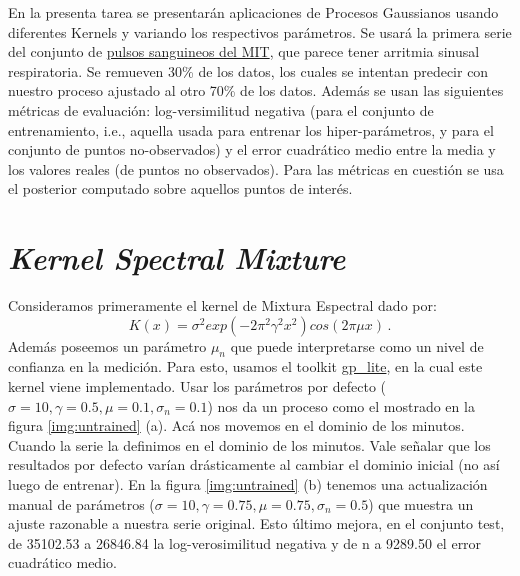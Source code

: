 \documentclass[letterpaper,11pt,oneside]{article}
\theoremstyle{break}
\begin{document}
	





\inserttitle

En la presenta tarea se presentarán aplicaciones de Procesos Gaussianos usando diferentes Kernels y variando los respectivos parámetros. Se usará la primera serie del conjunto de \href{https://ecg.mit.edu/time-series/}{pulsos sanguineos del MIT}, que parece tener arritmia sinusal respiratoria. Se remueven 30\% de los datos, los cuales se intentan predecir con nuestro proceso ajustado al otro 70\% de los datos. Además se usan las siguientes métricas de evaluación: log-versimilitud negativa (para el conjunto de entrenamiento, i.e., aquella usada para entrenar los hiper-parámetros, y para el conjunto de puntos no-observados) y el error cuadrático medio entre la media y los valores reales (de puntos no observados). Para las métricas en cuestión se usa el posterior computado sobre aquellos puntos de interés.

\section{\textit{Kernel Spectral Mixture}}
Consideramos primeramente el kernel de Mixtura Espectral dado por: 
$$K(x)=\sigma^2 exp(-2\pi^2\gamma^2x^2)cos(2\pi\mu x)\,.$$
Además poseemos un parámetro $\mu_n$ que puede interpretarse como un nivel de confianza en la medición. Para esto, usamos el toolkit \href{https://github.com/GAMES-UChile/The_Art_of_Gaussian_Processes}{gp\_lite}, en la cual este kernel viene implementado. Usar los parámetros por defecto ($\sigma = 10, \gamma = 0.5, \mu = 0.1, \sigma_n = 0.1$) nos da un proceso como el mostrado en la figura \ref{img:untrained} (a). Acá nos movemos en el dominio de los minutos. Cuando la serie la definimos en el dominio de los minutos. Vale señalar que los resultados por defecto varían drásticamente al cambiar el dominio inicial (no así luego de entrenar). En la figura \ref{img:untrained} (b) tenemos una actualización manual de parámetros ($\sigma = 10, \gamma = 0.75, \mu = 0.75, \sigma_n = 0.5$) que muestra un ajuste razonable a nuestra serie original. Esto último mejora, en el conjunto test, de 35102.53 a 26846.84 la log-verosimilitud negativa y de n a 9289.50 el error cuadrático medio.
\end{document}
